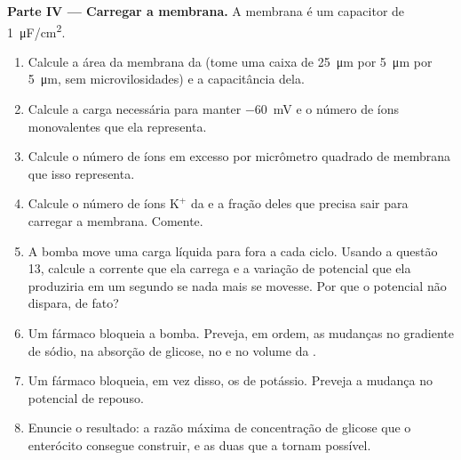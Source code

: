 \begin{problem}
\medskip
\noindent\textbf{Parte IV --- Carregar a membrana.}
A membrana é um capacitor de \qty{1}{\micro F/cm^2}.
\begin{enumerate}[resume]
  \item Calcule a área da membrana da  (tome uma caixa de
        \qty{25}{\micro m} por \qty{5}{\micro m} por \qty{5}{\micro m},
        sem microvilosidades) e a capacitância dela.
  \item Calcule a carga necessária para manter \qty{-60}{mV} e o número
        de íons monovalentes que ela representa.
  \item Calcule o número de íons em excesso por micrômetro quadrado de
        membrana que isso representa.
  \item Calcule o número de íons $\mathrm{K^+}$ da  e a fração
        deles que precisa sair para carregar a membrana. Comente.
  \item A bomba move uma carga líquida para fora a cada ciclo. Usando a
        questão 13, calcule a corrente que ela carrega e a variação de
        potencial que ela produziria em um segundo se nada mais se
        movesse. Por que o potencial não dispara, de fato?
  \item Um fármaco bloqueia a bomba. Preveja, em ordem, as mudanças no
        gradiente de sódio, na absorção de glicose, no  e no volume da .
  \item Um fármaco bloqueia, em vez disso, os  de potássio.
        Preveja a mudança no potencial de repouso.
  \item Enuncie o resultado: a razão máxima de concentração de glicose
        que o enterócito consegue construir, e as duas  que a tornam possível.
\end{enumerate}
\end{problem}
